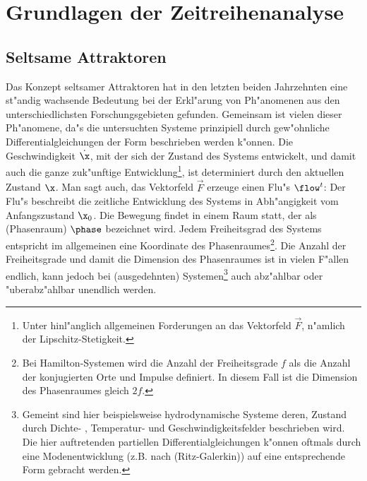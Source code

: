\clearpage
\chapter{Grundlagen der Zeitreihenanalyse}



\section{Seltsame Attraktoren}
\label{chapdynsystems}

Das Konzept seltsamer Attraktoren hat in den letzten beiden Jahrzehnten eine st"andig
wachsende Bedeutung bei der Erkl"arung von Ph"anomenen aus den unterschiedlichsten
Forschungsgebieten gefunden. Gemeinsam ist vielen dieser Ph"anomene, da"s die untersuchten
Systeme prinzipiell durch gew"ohnliche Differentialgleichungen der Form
beschrieben werden k"onnen. Die Geschwindigkeit $\dot\x$, mit der sich der Zustand des
Systems entwickelt, und damit auch die ganze zuk"unftige Entwicklung\footnote{Unter
  hinl"anglich allgemeinen Forderungen an das Vektorfeld $\vec F$, n"amlich der
  Lipschitz-Stetigkeit.}, ist determiniert durch den aktuellen Zustand $\x$. Man sagt
auch, das Vektorfeld $\vec F$ erzeuge einen Flu"s $\flow^t$:
Der Flu"s beschreibt die zeitliche Entwicklung des Systems in Abh"angigkeit vom
Anfangszustand $\x_0$.  Die Bewegung findet in einem Raum statt, der als
\begriff(Phasenraum) $\phase$ bezeichnet wird. Jedem Freiheitsgrad des Systems entspricht
im allgemeinen eine Koordinate des Phasenraumes\footnote{Bei Hamilton-Systemen wird die
  Anzahl der Freiheitsgrade $f$ als die Anzahl der konjugierten Orte und Impulse
  definiert. In diesem Fall ist die Dimension des Phasenraumes gleich $2f$.}. Die Anzahl
der Freiheitsgrade und damit die Dimension des Phasenraumes ist in vielen F"allen endlich,
kann jedoch bei \naja(ausgedehnten) Systemen\footnote{Gemeint sind hier beispielsweise
  hydrodynamische Systeme deren, Zustand durch Dichte- , Temperatur- und
  Geschwindigkeitsfelder beschrieben wird. Die hier auftretenden partiellen
  Differentialgleichungen k"onnen oftmals durch eine Modenentwicklung (z.B. nach
  \autor(Ritz-Galerkin)) auf eine  entsprechende Form gebracht werden.}
auch abz"ahlbar oder "uberabz"ahlbar unendlich werden.

